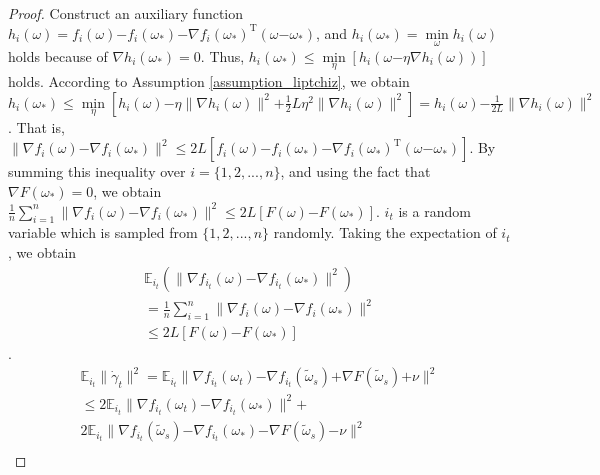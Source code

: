 \documentclass[letterpaper]{article}
\begin{document}
\begin{proof}
Construct an auxiliary function $h_i(\omega)=f_i(\omega)\mathrm{-}f_i(\omega_\ast)\mathrm{-}\nabla f_i(\omega_\ast)^\mathrm{T}(\omega\mathrm{-}\omega_\ast)$, and $h_i(\omega_\ast)=\min\limits_\omega h_i(\omega)$ holds because of $\nabla h_i(\omega_\ast)=0$. Thus, $h_i(\omega_\ast)\le \min\limits_\eta [h_i(\omega\mathrm{-}\eta \nabla h_i(\omega))]$ holds. According to Assumption \ref{assumption_liptchiz}, we obtain
$h_i(\omega_\ast)\le\min\limits_\eta [h_i(\omega)\mathrm{-}\eta \parallel \nabla h_i(\omega) \parallel^2\mathrm{+}\frac{1}{2} L \eta^2 \parallel  \nabla h_i(\omega)  \parallel^2  ] 
=h_i(\omega)\mathrm{-}\frac{1}{2L}\parallel  \nabla h_i(\omega) \parallel^2$.  That is, 
$\parallel   \nabla f_i(\omega)  \mathrm{-} \nabla f_i(\omega_\ast)   \parallel^2 \le 2L [ f_i(\omega)  \mathrm{-}  f_i(\omega_\ast)  \mathrm{-}\nabla f_i(\omega_\ast)^{\mathrm{T}}(\omega\mathrm{-}\omega_\ast)  ]$. By summing this inequality over $i=\{1,2, ..., n\}$, and using the fact that $\nabla F(\omega_\ast)=0$, we obtain $
\frac{1}{n} \sum\limits_{i=1}^n \parallel  \nabla f_i(\omega)  \mathrm{-} \nabla f_i(\omega_\ast)  \parallel^2  \mathrm{\le}   2L [F(\omega)\mathrm{-}F(\omega_\ast)] $. $i_t$ is a random variable which is sampled from $\{1,2, ...,n\}$ randomly. Taking the expectation of $i_t$, we obtain 
\begin{equation}\label{equa_1}
\begin{array}{ll}
\mathbb{E}_{i_t}(\parallel  \nabla f_{i_{t}}(\omega) \mathrm{-} \nabla f_{i_{t}}(\omega_{\ast}) \parallel^2) \\
= \frac{1}{n} \sum\limits_{i=1}^n \parallel  \nabla f_i(\omega)  \mathrm{-} \nabla f_i(\omega_\ast)  \parallel^2 \\
\le 2L [F(\omega)\mathrm{-}F(\omega_\ast)] 
\end{array} 
\end{equation}.  
\begin{equation}\label{equa_2}
\begin{array}{ll}
\mathbb{E}_{i_t}\parallel  \dot{\gamma}_{t} \parallel^2  
= \mathbb{E}_{i_t} \parallel \nabla f_{i_{t}}(\omega_{t}) \mathrm{-} \nabla f_{i_{t}}(\tilde{\omega}_s)  \mathrm{+} \nabla F(\tilde{\omega}_s) \mathrm{+} \nu \parallel^2\\
\le 2\mathbb{E}_{i_t} \parallel \nabla f_{i_{t}}(\omega_{t}) \mathrm{-} \nabla f_{i_{t}}(\omega_{\ast}) \parallel^2 \mathrm{+}\\
 2 \mathbb{E}_{i_t} \parallel  \nabla f_{i_{t}}(\tilde{\omega}_{s}) \mathrm{-} \nabla f_{i_{t}}(\omega_{\ast}) \mathrm{-} \nabla F(\tilde{\omega}_s)   \mathrm{-} \nu  \parallel^2  \\

\end{array}
\end{equation}
\end{proof}
\end{document}
